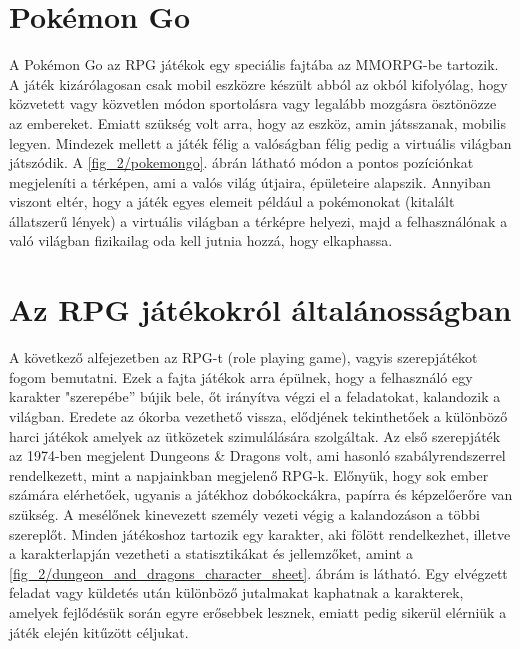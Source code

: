 \section*{Pokémon Go}
\label{pokemongo}


A Pokémon Go az RPG játékok egy speciális fajtába az MMORPG-be tartozik. 
A játék kizárólagosan csak mobil eszközre készült abból az okból kifolyólag, hogy közvetett vagy közvetlen módon sportolásra vagy legalább mozgásra ösztönözze az embereket. 
Emiatt szükség volt arra, hogy az eszköz, amin játsszanak, mobilis legyen. 
Mindezek mellett a játék félig a valóságban félig pedig a virtuális világban játszódik. 
A \ref{fig_2/pokemongo}. ábrán látható módon a pontos pozíciónkat megjeleníti a térképen, ami a valós világ útjaira, épületeire alapszik. 
Annyiban viszont eltér, hogy a játék egyes elemeit például a pokémonokat (kitalált állatszerű lények) a virtuális világban a térképre helyezi, majd a felhasználónak a való világban fizikailag oda kell jutnia hozzá, hogy elkaphassa. 

\section{Az RPG játékokról általánosságban}
\label{rpgaltalanos}


A következő alfejezetben az RPG-t (role playing game), vagyis szerepjátékot fogom bemutatni. 
Ezek a fajta játékok arra épülnek, hogy a felhasználó egy karakter "szerepébe” bújik bele, őt irányítva végzi el a feladatokat, kalandozik a világban. 
Eredete az ókorba vezethető vissza, elődjének tekinthetőek a különböző harci játékok amelyek az ütközetek szimulálására szolgáltak. 
Az első szerepjáték az 1974-ben megjelent Dungeons \& Dragons volt, ami hasonló szabályrendszerrel rendelkezett, mint a napjainkban megjelenő RPG-k. 
Előnyük, hogy sok ember számára elérhetőek, ugyanis a játékhoz dobókockákra, papírra és képzelőerőre van szükség. 
A mesélőnek kinevezett személy vezeti végig a kalandozáson a többi szereplőt. 
Minden játékoshoz tartozik egy karakter, aki fölött rendelkezhet, illetve a karakterlapján vezetheti a statisztikákat és jellemzőket, amint a \ref{fig_2/dungeon_and_dragons_character_sheet}. ábrám is látható. 
Egy elvégzett feladat vagy küldetés után különböző jutalmakat kaphatnak a karakterek, amelyek fejlődésük során egyre erősebbek lesznek, emiatt pedig sikerül elérniük a játék elején kitűzött céljukat. 

